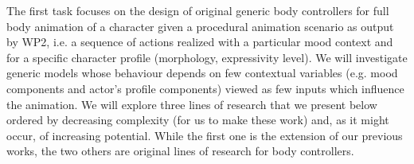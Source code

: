 The first task focuses on the design of original generic body controllers for full body animation of a character given a procedural animation scenario as output by WP2, i.e. a sequence of actions realized with a particular mood context and for a specific character profile (morphology, expressivity level). 
We will investigate generic models whose behaviour depends on few contextual variables (e.g. mood components and actor's profile components) viewed as few inputs which influence the animation. 
We will explore three lines of research that we present below ordered by decreasing complexity (for us to make these work) and, as it might occur, of increasing potential. While the first one is the extension of our previous works, the two others are original lines of research for body controllers. 




